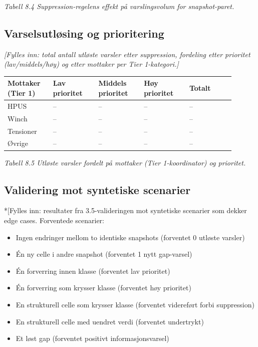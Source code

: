 \documentclass[a4paper,11pt]{article}
\begin{document}
\begin{center}\small\textit{Tabell 8.4 Suppression-regelens effekt på varslingsvolum for snapshot-paret.}\end{center}

\subsection{Varselsutløsing og prioritering}

\textit{[Fylles inn: total antall utløste varsler etter suppression, fordeling etter prioritet (lav/middels/høy) og etter mottaker per Tier 1-kategori.]}

\begin{longtable}{|>{\RaggedRight}p{0.180\linewidth}|>{\RaggedRight}p{0.180\linewidth}|>{\RaggedRight}p{0.180\linewidth}|>{\RaggedRight}p{0.180\linewidth}|>{\RaggedRight}p{0.180\linewidth}|}
\hline
\textbf{Mottaker (Tier 1)} & \textbf{Lav prioritet} & \textbf{Middels prioritet} & \textbf{Høy prioritet} & \textbf{Totalt} \\
\hline
\endhead
HPUS & – & – & – & – \\
\hline
Winch & – & – & – & – \\
\hline
Tensioner & – & – & – & – \\
\hline
Øvrige & – & – & – & – \\
\hline
\end{longtable}

\begin{center}\small\textit{Tabell 8.5 Utløste varsler fordelt på mottaker (Tier 1-koordinator) og prioritet.}\end{center}

\subsection{Validering mot syntetiske scenarier}

*[Fylles inn: resultater fra 3.5-valideringen mot syntetiske scenarier som dekker edge cases. Forventede scenarier:

\begin{itemize}
\item Ingen endringer mellom to identiske snapshots (forventet 0 utløste varsler)
\item Én ny celle i andre snapshot (forventet 1 nytt gap-varsel)
\item Én forverring innen klasse (forventet lav prioritet)
\item Én forverring som krysser klasse (forventet høy prioritet)
\item En strukturell celle som krysser klasse (forventet videreført forbi suppression)
\item En strukturell celle med uendret verdi (forventet undertrykt)
\item Et løst gap (forventet positivt informasjonsvarsel)
\end{itemize}
\end{document}
